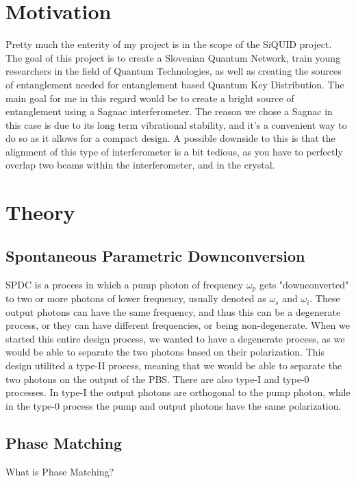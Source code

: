 \documentclass{article}
\begin{document}
\section{Motivation}
Pretty much the enterity of my project is in the scope of the SiQUID project. The goal of this project is to create a Slovenian Quantum Network, train young researchers in the field of Quantum Technologies, as well as 
creating the sources of entanglement needed for entanglement based Quantum Key Distribution. The main goal for me in this regard would be to create a bright source of entanglement using a Sagnac interferometer. The reason we 
chose a Sagnac in this case is due to its long term vibrational stability, and it's a convenient way to do so as it allows for a compact design. A possible downside to this is that the alignment of this type of 
interferometer is a bit tedious, as you have to perfectly overlap two beams within the interferometer, and in the crystal.

\section{Theory}
\subsection{Spontaneous Parametric Downconversion}
SPDC is a process in which a pump photon of frequency $\omega_p$ gets "downconverted" to two or more photons of lower frequency, usually denoted as $\omega_s$ and $\omega_i$. These output photons can have the same frequency,
and thus this can be a degenerate process, or they can have different frequencies, or being non-degenerate. When we started this entire design process, we wanted to have a degenerate process,
as we would be able to separate the two photons based on their polarization. This design utilited a type-II process, meaning that we would be able to separate the two photons on the output of the PBS.
There are also type-I and type-0 processes. In type-I the output photons are orthogonal to the pump photon, while in the type-0 process the pump and output photons have the same polarization.

\subsection{Phase Matching}
What is Phase Matching? %
\end{document}
